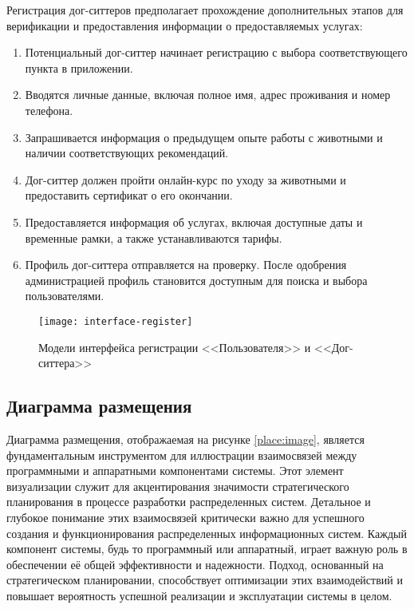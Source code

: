 Регистрация дог-ситтеров предполагает прохождение дополнительных этапов для верификации и предоставления информации о предоставляемых услугах:
\begin{enumerate}
    \item Потенциальный дог-ситтер начинает регистрацию с выбора соответствующего пункта в приложении.
    \item Вводятся личные данные, включая полное имя, адрес проживания и номер телефона.
    \item Запрашивается информация о предыдущем опыте работы с животными и наличии соответствующих рекомендаций.
    \item Дог-ситтер должен пройти онлайн-курс по уходу за животными и предоставить сертификат о его окончании.
    \item Предоставляется информация об услугах, включая доступные даты и временные рамки, а также устанавливаются тарифы.
    \item Профиль дог-ситтера отправляется на проверку. После одобрения администрацией профиль становится доступным для поиска и выбора пользователями.
\end{enumerate}


\begin{figure}[h!]
    \texttt{[image: interface-register]}
    \caption{Модели интерфейса регистрации <<Пользователя>> и <<Дог-ситтера>>}
    \label{fig:register}
\end{figure}

\subsection{Диаграмма размещения}

Диаграмма размещения, отображаемая на рисунке \ref{place:image}, является фундаментальным инструментом для иллюстрации взаимосвязей между программными и аппаратными компонентами системы. Этот элемент визуализации служит для акцентирования значимости стратегического планирования в процессе разработки распределенных систем. Детальное и глубокое понимание этих взаимосвязей критически важно для успешного создания и функционирования распределенных информационных систем\cite{makni}. Каждый компонент системы, будь то программный или аппаратный, играет важную роль в обеспечении её общей эффективности и надежности. Подход, основанный на стратегическом планировании, способствует оптимизации этих взаимодействий и повышает вероятность успешной реализации и эксплуатации системы в целом.


